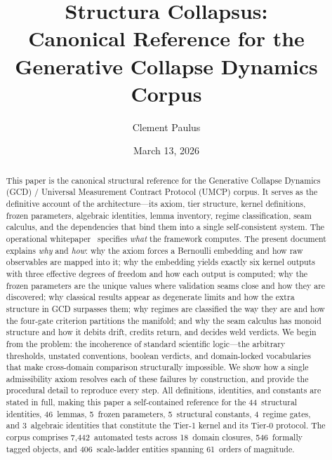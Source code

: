 \documentclass[
  aps,
  prd,
  twocolumn,
  superscriptaddress,
  nofootinbib,
  floatfix
]{revtex4-2}
\begin{document}
\title{Structura Collapsus:
\texorpdfstring{\\}{: }Canonical Reference for the
Generative Collapse Dynamics Corpus}

\author{Clement Paulus}

\date{March 13, 2026}

\begin{abstract}
This paper is the canonical structural reference for the
Generative Collapse Dynamics (GCD) / Universal Measurement
Contract Protocol (UMCP) corpus.  It serves as the definitive
account of the architecture---its axiom, tier structure, kernel
definitions, frozen parameters, algebraic identities, lemma
inventory, regime classification, seam calculus, and the
dependencies that bind them into a single self-consistent system.
The operational whitepaper~\cite{umcpmetadatarepo} specifies
\emph{what} the framework computes.  The present document
explains \emph{why} and \emph{how}: why the axiom forces a
Bernoulli embedding and how raw observables are mapped into it;
why the embedding yields exactly six kernel outputs with three
effective degrees of freedom and how each output is computed; why
the frozen parameters are the unique values where validation
seams close and how they are discovered; why classical results
appear as degenerate limits and how the extra structure in GCD
surpasses them; why regimes are classified the way they are and
how the four-gate criterion partitions the manifold; and why the
seam calculus has monoid structure and how it debits drift,
credits return, and decides weld verdicts.  We begin from the
problem: the incoherence of standard scientific logic---the
arbitrary thresholds, unstated conventions, boolean verdicts, and
domain-locked vocabularies that make cross-domain comparison
structurally impossible.  We show how a single admissibility
axiom resolves each of these failures by construction, and
provide the procedural detail to reproduce every step.  All
definitions, identities, and constants are stated in full,
making this paper a self-contained reference for the
44~structural identities, 46~lemmas, 5~frozen parameters,
5~structural constants, 4~regime gates, and 3~algebraic
identities that constitute the Tier-1 kernel and its Tier-0
protocol.  The corpus comprises 7{,}442~automated tests across
18~domain closures, 546~formally tagged objects, and
406~scale-ladder entities spanning 61~orders of magnitude.
\end{abstract}
\end{document}
